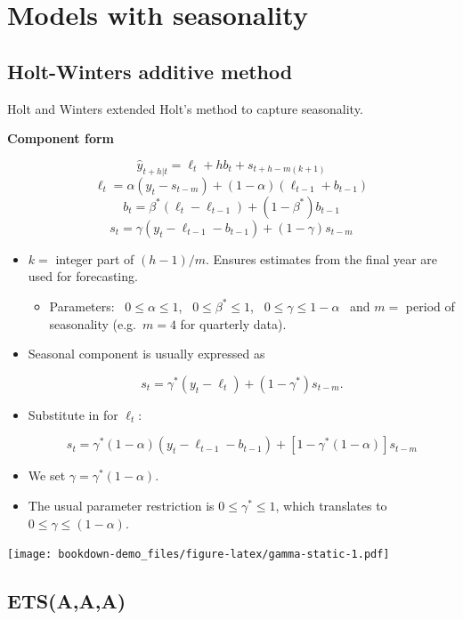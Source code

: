 \documentclass[]{book}
\providecommand{\tightlist}{%
  \setlength{\itemsep}{0pt}\setlength{\parskip}{0pt}}
\begin{document}
\hypertarget{models-with-seasonality}{%
\section{Models with seasonality}\label{models-with-seasonality}}

\hypertarget{holt-winters-additive-method}{%
\subsection{Holt-Winters additive method}\label{holt-winters-additive-method}}

Holt and Winters extended Holt's method to capture seasonality.

\textbf{Component form}

\[\hat{y}_{t+h|t} = \ell_{t} + hb _{t} + s_{t+h-m(k+1)}\]
\[\ell_{t} = \alpha(y_{t} - s_{t-m}) + (1 - \alpha)(\ell_{t-1} + b_{t-1})\]
\[b_{t} = \beta^*(\ell_{t} - \ell_{t-1}) + (1 - \beta^*)b_{t-1}\]
\[s_{t} = \gamma (y_{t}-\ell_{t-1}-b_{t-1}) + (1-\gamma)s_{t-m}\]

\begin{itemize}
\item
  \(k=\) integer part of \((h-1)/m\). Ensures estimates from the final year are used for forecasting.

  \begin{itemize}
  \tightlist
  \item
    Parameters:~ \(0\le \alpha\le 1\),~ \(0\le \beta^*\le 1\),~ \(0\le \gamma\le 1-\alpha\)~ and \(m=\) period of seasonality (e.g.~\(m=4\) for quarterly data).
  \end{itemize}
\item
  Seasonal component is usually expressed as

  \[s_{t} = \gamma^* (y_{t}-\ell_{t})+ (1-\gamma^*)s_{t-m}.\]
\item
  Substitute in for \(\ell_t\):

  \[s_{t} = \gamma^*(1-\alpha) (y_{t}-\ell_{t-1}-b_{t-1})+ [1-\gamma^*(1-\alpha)]s_{t-m}\]
\item
  We set \(\gamma=\gamma^*(1-\alpha)\).
\item
  The usual parameter restriction is \(0\le\gamma^*\le1\), which translates to \(0\le\gamma\le(1-\alpha)\).
\end{itemize}

\texttt{[image: bookdown-demo\_files/figure-latex/gamma-static-1.pdf]}

\hypertarget{etsaaa}{%
\subsection{ETS(A,A,A)}\label{etsaaa}}
\end{document}
